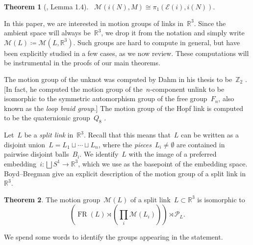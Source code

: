 \documentclass{amsart}
\theoremstyle{definition}
\theoremstyle{definition}
\theoremstyle{definition}
\theoremstyle{definition}
\newtheorem{theorem}{Theorem}[section]
\newcommand{\R}{\mathbb{R}}
\newcommand{\calM}{\mathcal{M}}
\newcommand{\calP}{\mathcal{P}} %
\newcommand{\calE}{\mathcal{E}}
\newcommand{\motion}[2]{\mathcal{M}\left({#1}, {#2}\right)} %
\DeclareMathOperator{\FR}{FR}
\begin{document}
\begin{theorem}[\cite{WattenbergSmoothMotionsUnlink72}, Lemma 1.4]\label{thm:smooth motion group is pi_1 of embedding space Wattenberg}
   ~$\motion{i(N)}{M} \cong \pi_1\left(\calE(i), i(N)\right)$.
\end{theorem}

In this paper, we are interested in motion groups of links in~$\R^3$. Since the ambient space will always be~$\R^3$, we drop it from the notation and simply write~$\calM(L) \coloneqq \calM(L,\R^3)$. Such groups are hard to compute in general, but have been explicitly studied in a few cases, as we now review. These computations will be instrumental in the proofs of our main theorems. 

The motion group of the unknot was computed by Dahm in his thesis to be~$\mathbb{Z}_2$ \cite{Dahm62, Goldsmith, BrendleHatcherRingsWickets13}. [In fact, he computed the motion group of the~$n$-component unlink to be isomorphic to the symmetric automorphism group of the free group~$F_n$, also known as the \emph{loop braid group}.] The motion group of the Hopf link is computed to be the quaternionic group~$Q_8$ \cite{DamianiKamadaRingHTrivialLinks19, Boyd-Bregman-Hopf}.

Let~$L$ be a \emph{split link} in~$\R^3$. Recall that this means that~$L$ can be written as a disjoint union~$L = L_1 \sqcup \cdots\sqcup L_n$, where the \emph{pieces}~$L_i \neq \emptyset$ are contained in pairwise disjoint balls~$B_i$. We identify~$L$ with the image of a preferred embedding~$i\colon \bigsqcup S^1 \rightarrow \R^3$, which we use as the basepoint of the embedding space. Boyd--Bregman \cite{Boyd-Bregman} give an explicit description of the motion group of a split link in~$\mathbb{R}^3$.

\begin{theorem}{\cite[Theorem A]{Boyd-Bregman}}\label{thm:motion_group_split_link}
    The  motion group~$\calM(L)$ of a split link~$L\subset\R^3$ is isomorphic to~$$\left(\FR(L) \rtimes \left(\prod_i\calM(L_i) \right)\right)\rtimes \calP_{L}.$$
\end{theorem}

We spend some words to identify the groups appearing in the statement.
\end{document}
